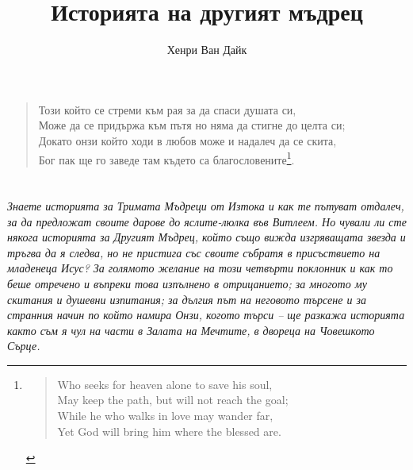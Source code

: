 \documentclass[oneside,10pt]{memoir}
\title{Историята на другият мъдрец}
\author{Хенри Ван Дайк}
\begin{document}
\thispagestyle{empty}


\newpage

\begin{KeepFromToc}
  \tableofcontents
\end{KeepFromToc}

\chapter*{}

\begin{quote}
  \fontsize{8}{10}\selectfont
  Този който се стреми към рая за да спаси душата си, \\
  Може да се придържа към пътя но няма да стигне до целта си; \\
  Докато онзи който ходи в любов може и надалеч да се скита, \\
  Бог пак ще го заведе там където са благословените\footnote{
  \begin{quote}
    Who seeks for heaven alone to save his soul, \\
    May keep the path, but will not reach the goal; \\
    While he who walks in love may wander far, \\
    Yet God will bring him where the blessed are.
  \end{quote}
  }.
\end{quote}

\newpage

\chapter*{}
\emph{
\fontsize{9}{10}\selectfont
Знаете историята за Тримата Мъдреци от Изтока и как те пътуват отдалеч, за да
предложат своите дарове до яслите-люлка във Витлеем. Но чували ли сте някога
историята за Другият Мъдрец, който също вижда изгряващата звезда и тръгва да я
следва, но не пристига със своите събратя в присъствието на младенеца Исус? За
голямото желание на този четвърти поклонник и как то беше отречено и въпреки
това изпълнено в отрицанието; за многото му скитания и душевни изпитания; за
дългия път на неговото търсене и за странния начин по който намира Онзи, когото
търси -- ще разкажа историята както съм я чул на части в Залата на Мечтите, в
двореца на Човешкото Сърце.
}
\end{document}
